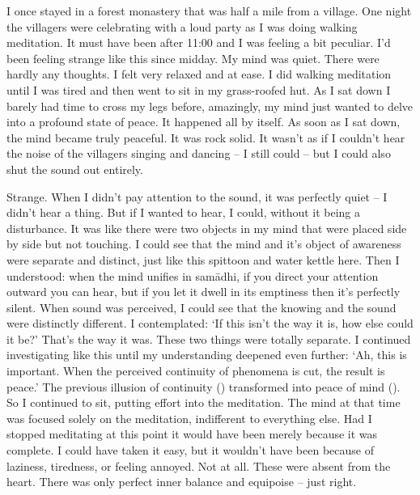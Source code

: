 I once stayed in a forest monastery that was half a mile from a village. One night the villagers were celebrating with a loud party as I was doing walking meditation. It must have been after 11:00 and I was feeling a bit peculiar. I'd been feeling strange like this since midday. My mind was quiet. There were hardly any thoughts. I felt very relaxed and at ease. I did walking meditation until I was tired and then went to sit in my grass-roofed hut. As I sat down I barely had time to cross my legs before, amazingly, my mind just wanted to delve into a profound state of peace. It happened all by itself. As soon as I sat down, the mind became truly peaceful. It was rock solid. It wasn't as if I couldn't hear the noise of the villagers singing and dancing -- I still could -- but I could also shut the sound out entirely.

Strange. When I didn't pay attention to the sound, it was perfectly quiet -- I didn't hear a thing. But if I wanted to hear, I could, without it being a disturbance. It was like there were two objects in my mind that were placed side by side but not touching. I could see that the mind and it's object of awareness were separate and distinct, just like this spittoon and water kettle here. Then I understood: when the mind unifies in sam\=adhi, if you direct your attention outward you can hear, but if you let it dwell in its emptiness then it's perfectly silent. When sound was perceived, I could see that the knowing and the sound were distinctly different. I contemplated: `If this isn't the way it is, how else could it be?' That's the way it was. These two things were totally separate. I continued investigating like this until my understanding deepened even further: `Ah, this is important. When the perceived continuity of phenomena is cut, the result is peace.' The previous illusion of continuity () transformed into peace of mind (). So I continued to sit, putting effort into the meditation. The mind at that time was focused solely on the meditation, indifferent to everything else. Had I stopped meditating at this point it would have been merely because it was complete. I could have taken it easy, but it wouldn't have been because of laziness, tiredness, or feeling annoyed. Not at all. These were absent from the heart. There was only perfect inner balance and equipoise -- just right.

